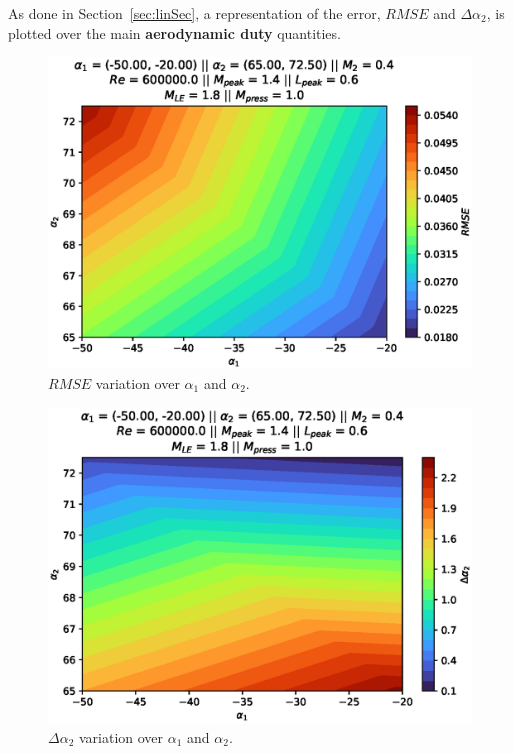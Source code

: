 As done in Section~\ref{sec:linSec}, a representation of the error, $RMSE$ and $\Delta \alpha_2$, is plotted over the main \textbf{aerodynamic duty} quantities.

\begin{figure}[!ht]
    \centering
    \includegraphics[scale=0.7]{figures/interpolation/alpha1alpha2RMSE.eps}
    \caption{$RMSE$ variation over $\alpha_1$ and $\alpha_2$.}
\end{figure}

\begin{figure}[!ht]
    \centering
    \includegraphics[scale=0.7]{figures/interpolation/alpha1alpha2AlphaError.eps}
    \caption{$\Delta \alpha_2$ variation over $\alpha_1$ and $\alpha_2$.}
\end{figure}